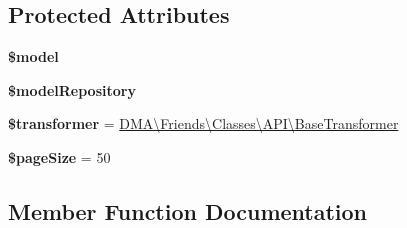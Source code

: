\subsection*{Protected Attributes}
\begin{DoxyCompactItemize}
\item 
\hypertarget{classDMA_1_1Friends_1_1Classes_1_1API_1_1BaseResource_a138e41bcc80cec6eb728fc30af62bc76}{}{\bfseries \$model}\label{classDMA_1_1Friends_1_1Classes_1_1API_1_1BaseResource_a138e41bcc80cec6eb728fc30af62bc76}

\item 
\hypertarget{classDMA_1_1Friends_1_1Classes_1_1API_1_1BaseResource_a3b9744ae88ff15132a19675eaec5b0da}{}{\bfseries \$model\+Repository}\label{classDMA_1_1Friends_1_1Classes_1_1API_1_1BaseResource_a3b9744ae88ff15132a19675eaec5b0da}

\item 
\hypertarget{classDMA_1_1Friends_1_1Classes_1_1API_1_1BaseResource_a8bed7a9fcacec10d025eb0458b8fd861}{}{\bfseries \$transformer} = \textquotesingle{}\hyperlink{classDMA_1_1Friends_1_1Classes_1_1API_1_1BaseTransformer}{D\+M\+A\textbackslash{}\+Friends\textbackslash{}\+Classes\textbackslash{}\+A\+P\+I\textbackslash{}\+Base\+Transformer}\textquotesingle{}\label{classDMA_1_1Friends_1_1Classes_1_1API_1_1BaseResource_a8bed7a9fcacec10d025eb0458b8fd861}

\item 
\hypertarget{classDMA_1_1Friends_1_1Classes_1_1API_1_1BaseResource_aa9446b4db56f3c5544f57167b35bd2e8}{}{\bfseries \$page\+Size} = 50\label{classDMA_1_1Friends_1_1Classes_1_1API_1_1BaseResource_aa9446b4db56f3c5544f57167b35bd2e8}

\end{DoxyCompactItemize}


\subsection{Member Function Documentation}
\hypertarget{classDMA_1_1Friends_1_1Classes_1_1API_1_1BaseResource_a98884c60fd1cd6a4b22b6b549c97e1e1}{}
